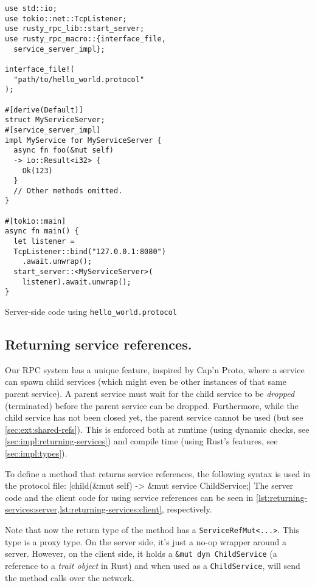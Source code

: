 \documentclass[11pt, twocolumn]{article}
\begin{document}
\begin{listing}
\begin{verbatim}
use std::io;
use tokio::net::TcpListener;
use rusty_rpc_lib::start_server;
use rusty_rpc_macro::{interface_file,
  service_server_impl};

interface_file!(
  "path/to/hello_world.protocol"
);

#[derive(Default)]
struct MyServiceServer;
#[service_server_impl]
impl MyService for MyServiceServer {
  async fn foo(&mut self)
  -> io::Result<i32> {
    Ok(123)
  }
  // Other methods omitted.
}

#[tokio::main]
async fn main() {
  let listener =
  TcpListener::bind("127.0.0.1:8080")
    .await.unwrap();
  start_server::<MyServiceServer>(
    listener).await.unwrap();
}

\end{verbatim}
\caption{Server-side code using \texttt{hello\_world.protocol}}
\label{lst:hello_world:server}
\end{listing}

\subsection{Returning service references.}

Our RPC system has a unique feature, inspired by Cap'n Proto\cite{capnproto}, where a service can spawn child services (which might even be other instances of that same parent service). A parent service must wait for the child service to be \textit{dropped} (terminated) before the parent service can be dropped. Furthermore, while the child service has not been closed yet, the parent service cannot be used (but see \cref{sec:ext:shared-refs}). This is enforced both at runtime (using dynamic checks, see \cref{sec:impl:returning-services}) and compile time (using Rust's features, see \cref{sec:impl:types}).

To define a method that returns service references, the following syntax is used in the protocol file:
|child(&mut self) -> &mut service ChildService;|
\noindent The server code and the client code for using service references can be seen in \cref{lst:returning-services:server,lst:returning-services:client}, respectively.

Note that now the return type of the method has a \texttt{ServiceRefMut<...>}. This type is a proxy type. On the server side, it's just a no-op wrapper around a server. However, on the client side, it holds a \texttt{\&mut dyn ChildService} (a reference to a \textit{trait object} in Rust) and when used as a \texttt{ChildService}, will send the method calls over the network.
\end{document}
